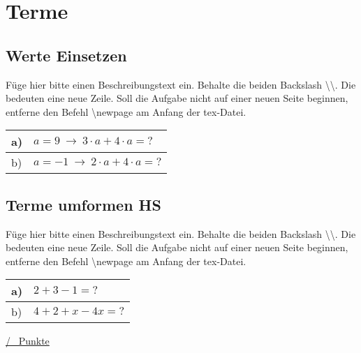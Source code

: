\newpage
\section{Terme}
\subsection{Werte Einsetzen}
Füge hier bitte einen Beschreibungstext ein. Behalte die beiden Backslash \textbackslash\textbackslash. Die bedeuten eine neue Zeile. Soll die Aufgabe nicht auf einer neuen Seite beginnen, entferne den Befehl \textbackslash newpage am Anfang der tex-Datei.\\
\begin{xltabular}{\textwidth}{|C{0.75cm}|X|}
\hline
a)& $a=9~ \rightarrow ~ 3 \cdot a + 4 \cdot a=?$
\\\hline
b)& $a=-1~ \rightarrow ~ 2 \cdot a + 4 \cdot a=?$
\\\hline
\end{xltabular}
\vspace{0.5cm}
\subsection{Terme umformen HS}
Füge hier bitte einen Beschreibungstext ein. Behalte die beiden Backslash \textbackslash\textbackslash. Die bedeuten eine neue Zeile. Soll die Aufgabe nicht auf einer neuen Seite beginnen, entferne den Befehl \textbackslash newpage am Anfang der tex-Datei.\\
\begin{xltabular}{\textwidth}{|C{0.75cm}|X|}
\hline
a)&$2 + 3 - 1=?$
\\\hline
b)&$4 + 2 + x - 4x=?$
\\\hline
\end{xltabular}
\vspace{0.5cm}
\begin{flushright}
\underline{\hspace{2cm}/ \punkte~Punkte}
\end{flushright}